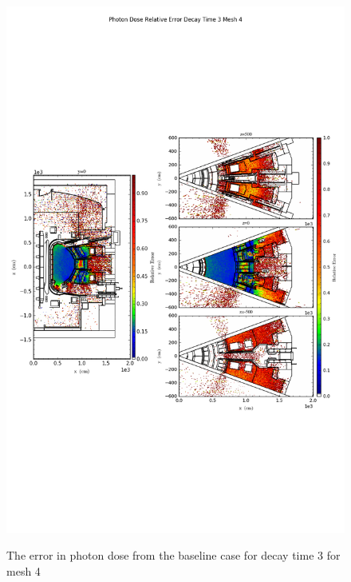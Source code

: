 \begin{figure}[ht!]
\centering
\includegraphics[trim={0cm 9cm 0cm 10cm},clip,scale=0.75]{../plots/final_model_nob4c/Photon_Dose_Relative_Error_Decay_Time_3_Mesh_4.png}
\label{fig:photons_dc3_no4bc_m4_error}
\caption{The error in photon dose from the baseline case for decay time 3 for mesh 4}
\end{figure}
